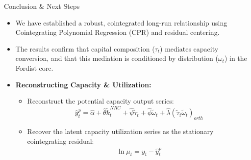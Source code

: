 \documentclass[10pt]{beamer}
\begin{document}
\begin{frame}{Conclusion \& Next Steps}
  \begin{itemize}
    \item We have established a robust, cointegrated long-run relationship using Cointegrating Polynomial Regression (CPR) and residual centering.
    \item The results confirm that capital composition ($\tau_t$) mediates capacity conversion, and that this mediation is conditioned by distribution ($\omega_t$) in the Fordist core.
    \item \textbf{Reconstructing Capacity \& Utilization:}
      \begin{itemize}
        \item Reconstruct the potential capacity output series:
          $$\hat{y}_t^p = \hat{\alpha} + \hat{\theta} \tilde{k}^{NRC}_t + \hat{\psi} \tilde{\tau}_t + \hat{\phi} \tilde{\omega}_t + \hat{\lambda} (\tilde{\tau}_t \tilde{\omega}_t)_{orth}$$
        \item Recover the latent capacity utilization series as the stationary cointegrating residual:
          $$\widehat{\ln \mu_t} = y_t - \hat{y}_t^p$$
      \end{itemize}
  \end{itemize}
\end{frame}
\end{document}
